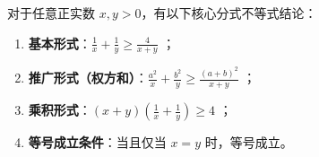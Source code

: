 \begin{statementbox}
对于任意正实数 $x, y > 0$，有以下核心分式不等式结论：
\begin{enumerate}
    \item \textbf{基本形式}：$\frac{1}{x} + \frac{1}{y} \geqslant \frac{4}{x+y}$ ；
    \item \textbf{推广形式（权方和）}：$\frac{a^2}{x} + \frac{b^2}{y} \geqslant \frac{(a+b)^2}{x+y}$ ；
    \item \textbf{乘积形式}：$(x+y)\left(\frac{1}{x} + \frac{1}{y}\right) \geqslant 4$ ；
    \item \textbf{等号成立条件}：当且仅当 $x = y$ 时，等号成立。
\end{enumerate}
\end{statementbox}
